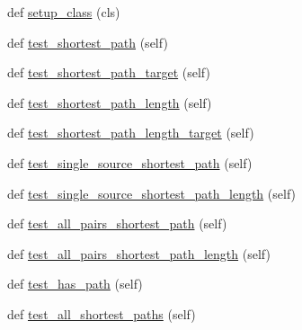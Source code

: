 \begin{DoxyCompactItemize}
\item 
def \hyperlink{classnetworkx_1_1algorithms_1_1shortest__paths_1_1tests_1_1test__generic_1_1TestGenericPath_acd6a14a86970d0ec70a197fa5ee9095f}{setup\+\_\+class} (cls)
\item 
def \hyperlink{classnetworkx_1_1algorithms_1_1shortest__paths_1_1tests_1_1test__generic_1_1TestGenericPath_a843d01b6515b2160934b7c687b9309cc}{test\+\_\+shortest\+\_\+path} (self)
\item 
def \hyperlink{classnetworkx_1_1algorithms_1_1shortest__paths_1_1tests_1_1test__generic_1_1TestGenericPath_aa46b9eb8502983a71e42d43aede760e3}{test\+\_\+shortest\+\_\+path\+\_\+target} (self)
\item 
def \hyperlink{classnetworkx_1_1algorithms_1_1shortest__paths_1_1tests_1_1test__generic_1_1TestGenericPath_a3799212bb28c1e2735900d449125f769}{test\+\_\+shortest\+\_\+path\+\_\+length} (self)
\item 
def \hyperlink{classnetworkx_1_1algorithms_1_1shortest__paths_1_1tests_1_1test__generic_1_1TestGenericPath_adc8b67682b011d31c5a20f8f0ceb4fb8}{test\+\_\+shortest\+\_\+path\+\_\+length\+\_\+target} (self)
\item 
def \hyperlink{classnetworkx_1_1algorithms_1_1shortest__paths_1_1tests_1_1test__generic_1_1TestGenericPath_a5ed72aeec8d1e66e98fb7118433cc74d}{test\+\_\+single\+\_\+source\+\_\+shortest\+\_\+path} (self)
\item 
def \hyperlink{classnetworkx_1_1algorithms_1_1shortest__paths_1_1tests_1_1test__generic_1_1TestGenericPath_a52b1c3ae79804d34f1288f6b280dfa3d}{test\+\_\+single\+\_\+source\+\_\+shortest\+\_\+path\+\_\+length} (self)
\item 
def \hyperlink{classnetworkx_1_1algorithms_1_1shortest__paths_1_1tests_1_1test__generic_1_1TestGenericPath_a87f24f93fa7d17552b7b824c21148ed4}{test\+\_\+all\+\_\+pairs\+\_\+shortest\+\_\+path} (self)
\item 
def \hyperlink{classnetworkx_1_1algorithms_1_1shortest__paths_1_1tests_1_1test__generic_1_1TestGenericPath_a26d299f2ed5a0dbfc1e2ee778169a22b}{test\+\_\+all\+\_\+pairs\+\_\+shortest\+\_\+path\+\_\+length} (self)
\item 
def \hyperlink{classnetworkx_1_1algorithms_1_1shortest__paths_1_1tests_1_1test__generic_1_1TestGenericPath_ae0355defdcdef37e3c1e810f472a418b}{test\+\_\+has\+\_\+path} (self)
\item 
def \hyperlink{classnetworkx_1_1algorithms_1_1shortest__paths_1_1tests_1_1test__generic_1_1TestGenericPath_ac29cfb02e5caf58f836903d2f17072e8}{test\+\_\+all\+\_\+shortest\+\_\+paths} (self)

\end{DoxyCompactItemize}
